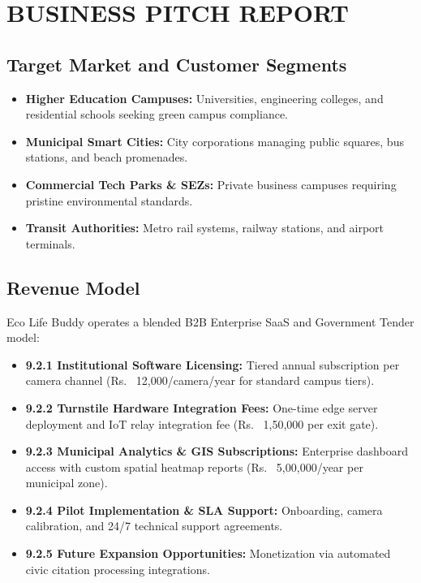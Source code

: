 \documentclass[12pt,a4paper]{report}
\begin{document}
\newpage
\chapter{BUSINESS PITCH REPORT}

\section{Target Market and Customer Segments}
\begin{itemize}
\item \textbf{Higher Education Campuses:} Universities, engineering colleges, and residential schools seeking green campus compliance.
\item \textbf{Municipal Smart Cities:} City corporations managing public squares, bus stations, and beach promenades.
\item \textbf{Commercial Tech Parks \& SEZs:} Private business campuses requiring pristine environmental standards.
\item \textbf{Transit Authorities:} Metro rail systems, railway stations, and airport terminals.
\end{itemize}

\section{Revenue Model}
Eco Life Buddy operates a blended B2B Enterprise SaaS and Government Tender model:
\begin{itemize}
\item \textbf{9.2.1 Institutional Software Licensing:} Tiered annual subscription per camera channel (Rs.~ 12,000/camera/year for standard campus tiers).
\item \textbf{9.2.2 Turnstile Hardware Integration Fees:} One-time edge server deployment and IoT relay integration fee (Rs.~ 1,50,000 per exit gate).
\item \textbf{9.2.3 Municipal Analytics \& GIS Subscriptions:} Enterprise dashboard access with custom spatial heatmap reports (Rs.~ 5,00,000/year per municipal zone).
\item \textbf{9.2.4 Pilot Implementation \& SLA Support:} Onboarding, camera calibration, and 24/7 technical support agreements.
\item \textbf{9.2.5 Future Expansion Opportunities:} Monetization via automated civic citation processing integrations.
\end{itemize}
\end{document}

